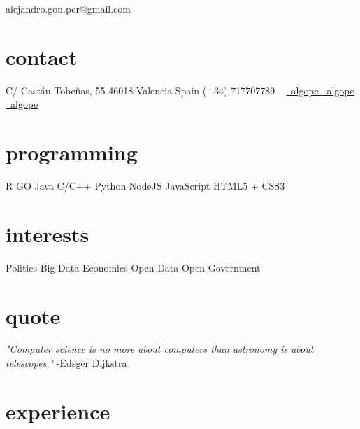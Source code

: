 \documentclass[]{friggeri-cv}
\begin{document}
       {alejandro.gon.per@gmail.com}


\begin{aside}
    \section{contact}
        C/ Castán Tobeñas, 55
        46018 Valencia-Spain
        (+34) 717707789
        ~
        \href{https://www.linkedin.com/in/algope}{\faLinkedin\ algope } 
        \href{http://github.com/algope}{\faGithub\ algope}
        \href{http://twitter.com/algope_}{\faTwitter\ algope}
    \section{programming}
        R
        GO
        Java
        C/C++
        Python
        NodeJS
        JavaScript
        HTML5 + CSS3
    \section{interests}
        Politics
        Big Data
        Economics
        Open Data
        Open Government
\end{aside}

\section{quote}
\emph{"Computer science is no more about computers than astronomy is about telescopes."} -Edsger Dijkstra

\section{experience}
\end{document}
